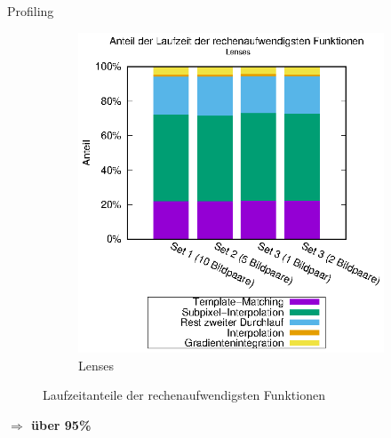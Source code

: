 \begin{frame}[allowframebreaks]{Profiling}
\begin{center}
\begin{figure}[h]
\begin{subfigure}[b]{0.45\linewidth}
				\includegraphics[width=\linewidth]{pdf/slow_lenses.eps}
				\caption{Lenses}
			\end{subfigure}
			\caption{Laufzeitanteile der rechenaufwendigsten Funktionen}
		\end{figure}
		\vspace{-0.35cm}
		\textbf{$ \Rightarrow $ über 95\%}
	\end{center}
\end{frame}
